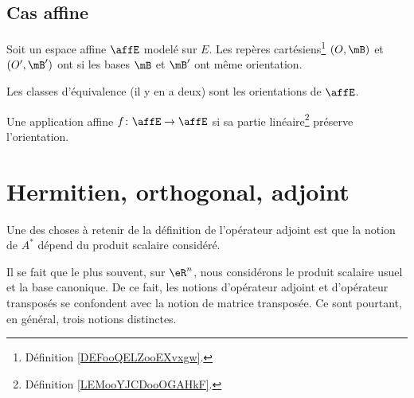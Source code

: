 \subsection{Cas affine}

\begin{definition}      \label{DEFooOTFPooIVkHFP}
    Soit un espace affine \( \affE\) modelé sur \( E\). Les repères cartésiens\footnote{Définition \ref{DEFooQELZooEXvxgw}.} \( (O,\mB)\) et \( (O',\mB')\) ont  si les bases \( \mB\) et \( \mB'\) ont même orientation.

    Les classes d'équivalence (il y en a deux) sont les orientations de \( \affE\).

Une application affine \( f\colon \affE\to \affE\)  si sa partie linéaire\footnote{Définition \ref{LEMooYJCDooOGAHkF}.} préserve l'orientation.
\end{definition}


\section{Hermitien, orthogonal, adjoint}


\begin{normaltext}      \label{NORMooWGEJooCtGtqZ}
    Une des choses à retenir de la définition de l'opérateur adjoint est que la notion de \( A^*\) dépend du produit scalaire considéré.
    
    Il se fait que le plus souvent, sur \( \eR^n\), nous considérons le produit scalaire usuel et la base canonique. De ce fait, les notions d'opérateur adjoint et d'opérateur transposés se confondent avec la notion de matrice transposée. Ce sont pourtant, en général, trois notions distinctes.
\end{normaltext}

